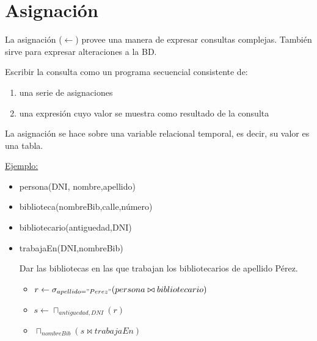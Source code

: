 \documentclass[12pt,a4paper]{report}
\begin{document}
	\section{Asignación}
		\par La asignación ($\leftarrow$) provee una manera de expresar consultas complejas. También sirve para expresar alteraciones a la BD.
		\par Escribir la consulta como un programa secuencial consistente de:
		\begin{enumerate}
			\item una serie de asignaciones
			\item una expresión cuyo valor se muestra como resultado de la consulta
		\end{enumerate}
		\par La asignación se hace sobre una variable relacional temporal, es decir, su valor es una tabla.
		
		\par \underline{Ejemplo:}
		\begin{itemize}
			\item persona(DNI, nombre,apellido)
			\item biblioteca(nombreBib,calle,número)
			\item bibliotecario(antiguedad,DNI)
			\item trabajaEn(DNI,nombreBib)
			\par Dar las bibliotecas en las que trabajan los bibliotecarios de apellido Pérez.
			\begin{itemize}
				\item $r \leftarrow \sigma_{apellido="Perez"} (persona \bowtie bibliotecario)$
				\item $s \leftarrow \sqcap_{antiguedad, DNI} (r)$
				\item $ \sqcap_{nombreBib} (s \bowtie trabajaEn)$
			\end{itemize}
		\end{itemize}
		
\end{document}
